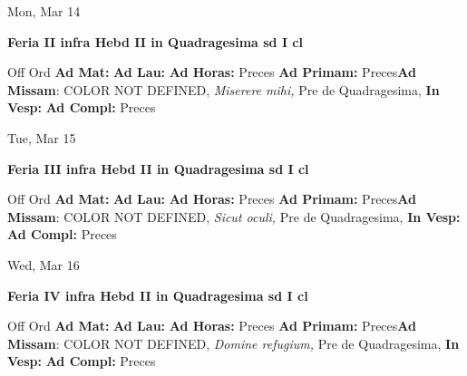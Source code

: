 \documentclass[10pt]{memoir}
\begin{document}
\begin{center}
\begin{minipage}{3.5in}
\vspace{2em}
\begin{center}Mon, Mar 14
\end{center}
\textbf{ \large Feria II infra Hebd II in Quadragesima
\textnormal{\normalsize sd I cl}}

\begin{justify}Off Ord
\textbf{Ad Mat: }
\textbf{Ad Lau: }
\textbf{Ad Horas: }Preces
\textbf{Ad Primam: }Preces\textbf{Ad Missam}: COLOR NOT DEFINED, \textit{Miserere mihi,} Pre de Quadragesima, 
\textbf{In Vesp: }
\textbf{Ad Compl: }Preces
\end{justify}
\end{minipage}
\end{center}

\begin{center}
\begin{minipage}{3.5in}
\vspace{2em}
\begin{center}Tue, Mar 15
\end{center}
\textbf{ \large Feria III infra Hebd II in Quadragesima
\textnormal{\normalsize sd I cl}}

\begin{justify}Off Ord
\textbf{Ad Mat: }
\textbf{Ad Lau: }
\textbf{Ad Horas: }Preces
\textbf{Ad Primam: }Preces\textbf{Ad Missam}: COLOR NOT DEFINED, \textit{Sicut oculi,} Pre de Quadragesima, 
\textbf{In Vesp: }
\textbf{Ad Compl: }Preces
\end{justify}
\end{minipage}
\end{center}

\begin{center}
\begin{minipage}{3.5in}
\vspace{2em}
\begin{center}Wed, Mar 16
\end{center}
\textbf{ \large Feria IV infra Hebd II in Quadragesima
\textnormal{\normalsize sd I cl}}

\begin{justify}Off Ord
\textbf{Ad Mat: }
\textbf{Ad Lau: }
\textbf{Ad Horas: }Preces
\textbf{Ad Primam: }Preces\textbf{Ad Missam}: COLOR NOT DEFINED, \textit{Domine refugium,} Pre de Quadragesima, 
\textbf{In Vesp: }
\textbf{Ad Compl: }Preces
\end{justify}
\end{minipage}
\end{center}
\end{document}
